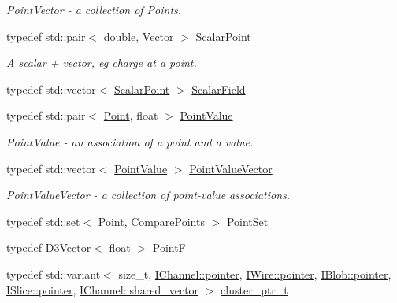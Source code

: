 \begin{DoxyCompactItemize}
\begin{DoxyCompactList}\small\item\em Point\+Vector -\/ a collection of Points. \end{DoxyCompactList}\item 
typedef std\+::pair$<$ double, \hyperlink{namespace_wire_cell_aa3c82d3ba85f032b0d278b7004846800}{Vector} $>$ \hyperlink{namespace_wire_cell_a8f847a3b6be6f6f898cbae3fa35098da}{Scalar\+Point}
\begin{DoxyCompactList}\small\item\em A scalar + vector, eg charge at a point. \end{DoxyCompactList}\item 
typedef std\+::vector$<$ \hyperlink{namespace_wire_cell_a8f847a3b6be6f6f898cbae3fa35098da}{Scalar\+Point} $>$ \hyperlink{namespace_wire_cell_ab842150a1d0627e0477dcd59ff427296}{Scalar\+Field}
\item 
typedef std\+::pair$<$ \hyperlink{namespace_wire_cell_ab2b2565fa6432efbb4513c14c988cda9}{Point}, float $>$ \hyperlink{namespace_wire_cell_abc1e159db6ef5d9b40f5aab6bd93352f}{Point\+Value}
\begin{DoxyCompactList}\small\item\em Point\+Value -\/ an association of a point and a value. \end{DoxyCompactList}\item 
typedef std\+::vector$<$ \hyperlink{namespace_wire_cell_abc1e159db6ef5d9b40f5aab6bd93352f}{Point\+Value} $>$ \hyperlink{namespace_wire_cell_a9cdf8eab5ec63490f0328e5ab18219de}{Point\+Value\+Vector}
\begin{DoxyCompactList}\small\item\em Point\+Value\+Vector -\/ a collection of point-\/value associations. \end{DoxyCompactList}\item 
typedef std\+::set$<$ \hyperlink{namespace_wire_cell_ab2b2565fa6432efbb4513c14c988cda9}{Point}, \hyperlink{struct_wire_cell_1_1_compare_points}{Compare\+Points} $>$ \hyperlink{namespace_wire_cell_ab4baa470f96cef6cf5eef6601d4ee6ad}{Point\+Set}
\item 
typedef \hyperlink{class_wire_cell_1_1_d3_vector}{D3\+Vector}$<$ float $>$ \hyperlink{namespace_wire_cell_a5ec8176c29cc534839f348e55e50b7f1}{PointF}
\item 
typedef std\+::variant$<$ size\+\_\+t, \hyperlink{class_wire_cell_1_1_i_data_aff870b3ae8333cf9265941eef62498bc}{I\+Channel\+::pointer}, \hyperlink{class_wire_cell_1_1_i_data_aff870b3ae8333cf9265941eef62498bc}{I\+Wire\+::pointer}, \hyperlink{class_wire_cell_1_1_i_data_aff870b3ae8333cf9265941eef62498bc}{I\+Blob\+::pointer}, \hyperlink{class_wire_cell_1_1_i_data_aff870b3ae8333cf9265941eef62498bc}{I\+Slice\+::pointer}, \hyperlink{class_wire_cell_1_1_i_data_a6edac35e7dd886018740993b28c7ca1e}{I\+Channel\+::shared\+\_\+vector} $>$ \hyperlink{namespace_wire_cell_a0dd058393dc7c7e35d888c206b9d479d}{cluster\+\_\+ptr\+\_\+t}

\end{DoxyCompactItemize}
